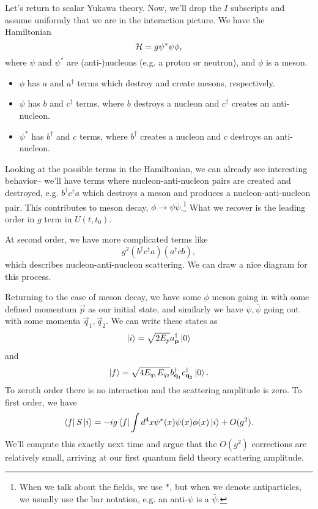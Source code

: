 Let's return to scalar Yukawa theory. Now, we'll drop the $I$ subscripts and assume uniformly that we are in the interaction picture. We have the Hamiltonian
$$\mathcal H = g \psi^* \psi \phi,$$
where $\psi$ and $\psi^*$ are (anti-)nucleons (e.g. a proton or neutron), and $\phi$ is a meson.
\begin{itemize}
    \item $\phi$ has $a$ and $a^\dagger$ terms which destroy and create mesons, respectively.
    \item $\psi$ has $b$ and $c^\dagger$ terms, where $b$ destroys a nucleon and $c^\dagger$ creates an anti-nucleon.
    \item $\psi^*$ has $b^\dagger$ and $c$ terms, where $b^\dagger$ creates a nucleon and $c$ destroys an anti-nucleon.
\end{itemize}
Looking at the possible terms in the Hamiltonian, we can already see interesting behavior-- we'll have terms where nucleon-anti-nucleon pairs are created and destroyed, e.g. $b^\dagger c^\dagger a$ which destroys a meson and produces a nucleon-anti-nucleon pair. This contributes to meson decay, $\phi\to \psi\bar \psi$.\footnote{When we talk about the fields, we use $*$, but when we denote antiparticles, we usually use the bar notation, e.g. an anti-$\psi$ is a $\bar \psi$.} What we recover is the leading order in $g$ term in $U(t,t_0)$.

At second order, we have more complicated terms like
$$g^2(b^\dagger c^\dagger a)(a^\dagger c b),$$
which describes nucleon-anti-nucleon scattering. We can draw a nice diagram for this process.

Returning to the case of meson decay, we have some $\phi$ meson going in with some defined momentum $\vec p$ as our initial state, and similarly we have $\psi,\bar \psi$ going out with some momenta $\vec q_1,\vec q_2.$ We can write these states as
$$\left| i \right>=\sqrt{2E_p}a_{\boldsymbol{\mathbf{p}}}^\dagger \left| 0 \right>$$
and
$$\left| f \right>=\sqrt{4E_{q_1}E_{q_2}}b_{\boldsymbol{\mathbf{q}}_1}^\dagger c_{\boldsymbol{\mathbf{q}}_2}^\dagger \left| 0 \right>.$$
To zeroth order there is no interaction and the scattering amplitude is zero. To first order, we have
$$\left< f \right|S\left| i \right>=-ig \left< f \right|\int d^4 x \psi^* (x) \psi(x) \phi(x) \left| i \right> + O(g^2).$$
We'll compute this exactly next time and argue that the $O(g^2)$ corrections are relatively small, arriving at our first quantum field theory scattering amplitude.